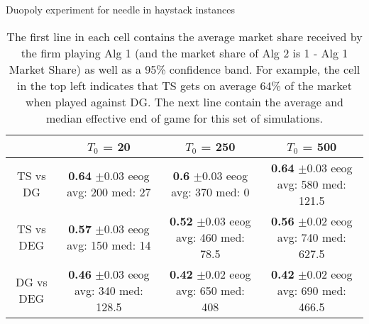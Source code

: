 \documentclass[../competing_bandits.tex]{subfiles}
\begin{document}
\begin{table}[ht]
\centering
\caption{Duopoly experiment for needle in haystack instances}
\begin{tabular}{|c|c|c|c|}
  \hline
 & $T_0$ = 20 & $T_0$ = 250 & $T_0$ = 500 \\
  \hline
TS vs DG & \makecell{\textbf{0.64} $\pm$0.03\\ eeog \\ avg: 200\\ med: 27} & \makecell{\textbf{0.6} $\pm$0.03\\ eeog \\ avg: 370\\ med: 0} & \makecell{\textbf{0.64} $\pm$0.03\\ eeog \\ avg: 580\\ med: 121.5} \\
\hline  
  TS vs DEG & \makecell{\textbf{0.57} $\pm$0.03\\ eeog \\ avg: 150\\ med: 14} & \makecell{\textbf{0.52} $\pm$0.03\\ eeog \\ avg: 460\\ med: 78.5} & \makecell{\textbf{0.56} $\pm$0.02\\ eeog \\ avg: 740\\ med: 627.5} \\
  \hline
  DG vs DEG & \makecell{\textbf{0.46} $\pm$0.03\\ eeog \\ avg: 340\\ med: 128.5} & \makecell{\textbf{0.42} $\pm$0.02\\ eeog \\ avg: 650\\ med: 408} & \makecell{\textbf{0.42} $\pm$0.02\\ eeog \\ avg: 690\\ med: 466.5} \\
   \hline
\end{tabular}
\label{sim_nih}
\caption*{{The first line in each cell contains the average market share received by the firm playing Alg 1 (and the market share of Alg 2 is 1 - Alg 1 Market Share) as well as a 95\% confidence band. For example, the cell in the top left indicates that TS gets on average 64\% of the market when played against DG. The next line contain the average and median effective end of game for this set of simulations.}}
\end{table}
\end{document}
